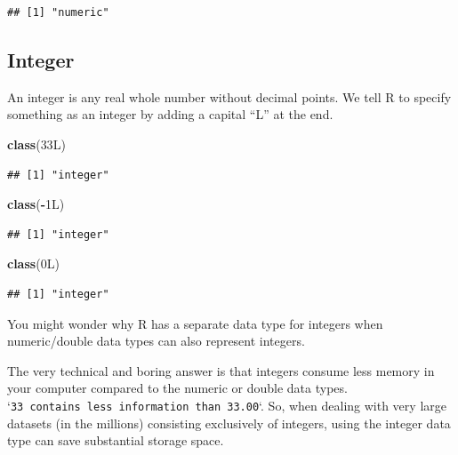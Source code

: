 \documentclass[
]{book}
\newenvironment{Shaded}{\begin{snugshade}}{\end{snugshade}}
\newcommand{\DataTypeTok}[1]{\textcolor[rgb]{0.13,0.29,0.53}{#1}}
\newcommand{\DecValTok}[1]{\textcolor[rgb]{0.00,0.00,0.81}{#1}}
\newcommand{\FunctionTok}[1]{\textcolor[rgb]{0.13,0.29,0.53}{\textbf{#1}}}
\newcommand{\NormalTok}[1]{#1}
\newcommand{\SpecialCharTok}[1]{\textcolor[rgb]{0.81,0.36,0.00}{\textbf{#1}}}
\begin{document}
\begin{verbatim}
## [1] "numeric"
\end{verbatim}

\subsection{Integer}\label{integer}

An integer is any real whole number without decimal points. We tell R to specify something as an integer by adding a capital ``L'' at the end.

\begin{Shaded}
\begin{Highlighting}[]
\FunctionTok{class}\NormalTok{(}\DecValTok{33}\DataTypeTok{L}\NormalTok{)}
\end{Highlighting}
\end{Shaded}

\begin{verbatim}
## [1] "integer"
\end{verbatim}

\begin{Shaded}
\begin{Highlighting}[]
\FunctionTok{class}\NormalTok{(}\SpecialCharTok{{-}}\DecValTok{1}\DataTypeTok{L}\NormalTok{)}
\end{Highlighting}
\end{Shaded}

\begin{verbatim}
## [1] "integer"
\end{verbatim}

\begin{Shaded}
\begin{Highlighting}[]
\FunctionTok{class}\NormalTok{(}\DecValTok{0}\DataTypeTok{L}\NormalTok{)}
\end{Highlighting}
\end{Shaded}

\begin{verbatim}
## [1] "integer"
\end{verbatim}

You might wonder why R has a separate data type for integers when numeric/double data types can also represent integers.

The very technical and boring answer is that integers consume less memory in your computer compared to the numeric or double data types. `\texttt{33\ contains\ less\ information\ than\ 33.00}`. So, when dealing with very large datasets (in the millions) consisting exclusively of integers, using the integer data type can save substantial storage space.
\end{document}
